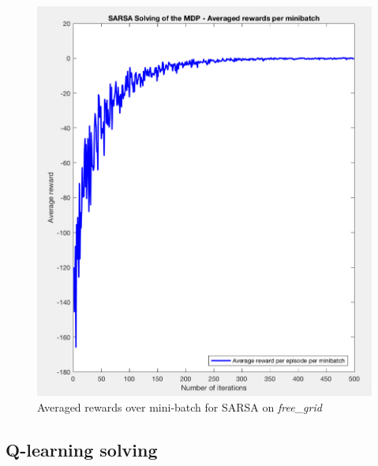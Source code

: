 \documentclass[a4paper]{report}
\begin{document}
{{{\begin{figure}[h!]
\begin{minipage}{0.4\linewidth}
						\includegraphics[width=\linewidth]{sarsa_average_rewards_freegrid}
						\caption{Averaged rewards over mini-batch for SARSA on \emph{free\_grid}}
					\end{minipage}
				\end{figure}
				  
			}
			\subsection{Q-learning solving}
			{
}}}
\end{document}
